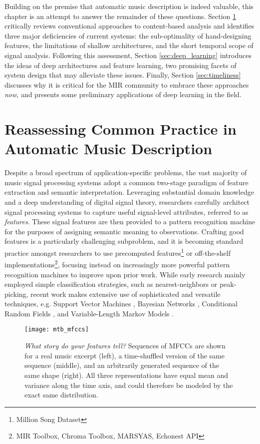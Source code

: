 Building on the premise that automatic music description is indeed valuable, this chapter is an attempt to answer the remainder of these questions.
Section \ref{sec:common} critically reviews conventional approaches to content-based analysis and identifies three major deficiencies of current systems: the sub-optimality of hand-designing features, the limitations of shallow architectures, and the short temporal scope of signal analysis.
Following this assessment, Section \ref{sec:deep_learning} introduces the ideas of deep architectures and feature learning, two promising facets of system design that may alleviate these issues.
Finally, Section \ref{sec:timeliness} discusses why it is critical for the MIR community to embrace these approaches \emph{now}, and presents some preliminary applications of deep learning in the field.


\section{Reassessing Common Practice in Automatic Music Description}
\label{sec:common}

Despite a broad spectrum of application-specific problems, the vast majority of music signal processing systems adopt a common two-stage paradigm of feature extraction and semantic interpretation.
Leveraging substantial domain knowledge and a deep understanding of digital signal theory, researchers carefully architect signal processing systems to capture useful signal-level attributes, referred to as \emph{features}.
These signal features are then provided to a pattern recognition machine for the purposes of assigning semantic meaning to observations.
Crafting good features is a particularly challenging subproblem, and it is becoming standard practice amongst researchers to use precomputed features\footnote{Million Song Dataset} or off-the-shelf implementations\footnote{MIR Toolbox, Chroma Toolbox, MARSYAS, Echonest API}, focusing instead on increasingly more powerful pattern recognition machines to improve upon prior work.
While early research mainly employed simple classification strategies, such as nearest-neighbors or peak-picking, recent work makes extensive use of sophisticated and versatile techniques, e.g. Support Vector Machines \cite{Mandel2005}, Bayesian Networks \cite{Mauch2010a}, Conditional Random Fields \cite{Sumi2012}, and Variable-Length Markov Models \cite{Chordia2011}.

\begin{figure}
\begin{centering}
\texttt{[image: mtb\_mfccs]}
\caption{\emph{What story do your features tell?} Sequences of MFCCs are shown for a real music excerpt (left), a time-shuffled version of the same sequence (middle), and an arbitrarily generated sequence of the same shape (right). All three representations have equal mean and variance along the time axis, and could therefore be modeled by the exact same distribution.}
\label{fig:mfccs}
\end{centering}
\end{figure}

